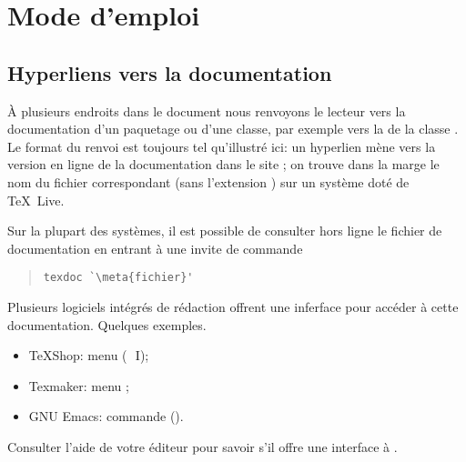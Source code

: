 \chapter{Mode d'emploi}
\label{chap:modedemploi}

\section*{Hyperliens vers la documentation}

À plusieurs endroits dans le document nous renvoyons le lecteur vers
la documentation d'un paquetage ou d'une classe, par exemple vers la %
de la classe . Le format du renvoi est toujours tel
qu'illustré ici: un hyperlien mène vers la version en ligne de la
documentation dans le site %
; on trouve dans la marge le
nom du fichier correspondant (sans l'extension ) sur un
système doté de {\TeX}~Live.

Sur la plupart des systèmes, il est possible de consulter hors ligne
le fichier de documentation  en entrant à une
invite de commande
\begin{quote}
\begin{lstlisting}[backgroundcolor=\color{white}]
texdoc `\meta{fichier}'
\end{lstlisting}
\end{quote}

Plusieurs logiciels intégrés de rédaction offrent une inferface pour
accéder à cette documentation. Quelques exemples.
\begin{itemize}
\item TeXShop: menu  (\optkey\,\cmdkey\, I);
\item Texmaker: menu ;
\item GNU Emacs: commande  ().
\end{itemize}
Consulter l'aide de votre éditeur pour savoir s'il offre une
interface à .

%

